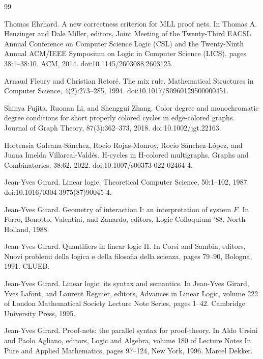 \documentclass[10pt,a4paper]{amsart}
\begin{document}
\begin{thebibliography}{99}
\par\noindent  [10]  Thomas Ehrhard.  A new correctness criterion for MLL proof nets.  In Thomas A. Henzinger and Dale Miller, editors, Joint Meeting of the Twenty-Third EACSL Annual Conference on Computer Science Logic (CSL) and the Twenty-Ninth Annual ACM/IEEE Symposium on Logic in Computer Science (LICS), pages 38:1–38:10. ACM, 2014.  doi:10.1145/2603088.2603125.  
 
\par\noindent  [11]  Arnaud Fleury and Christian Retoré.  The mix rule.  Mathematical Structures in Computer Science, 4(2):273–285, 1994.  doi:10.1017/S0960129500000451.  
 
\par\noindent  [12]  Shinya Fujita, Ruonan Li, and Shenggui Zhang.  Color degree and monochromatic degree conditions for short properly colored cycles in edge-colored graphs.  Journal of Graph Theory, 87(3):362–373, 2018.  doi:10.1002/jgt.22163.  
 
\par\noindent  [13]  Hortensia Galeana-Sánchez, Rocío Rojas-Monroy, Rocío Sánchez-López, and Juana Imelda Villareal-Valdés.  H-cycles in H-colored multigraphs.  Graphs and Combinatorics, 38:62, 2022.  doi:10.1007/s00373-022-02464-4.  
 
\par\noindent  [14]  Jean-Yves Girard.  Linear logic.  Theoretical Computer Science, 50:1–102, 1987.  doi:10.1016/0304-3975(87)90045-4.  
 
\par\noindent  [15]  Jean-Yves Girard.  Geometry of interaction I: an interpretation of system ${F}$.  In Ferro, Bonotto, Valentini, and Zanardo, editors, Logic Colloquium ’88. North-Holland, 1988.  
 
\par\noindent  [16]  Jean-Yves Girard.  Quantifiers in linear logic II.  In Corsi and Sambin, editors, Nuovi problemi della logica e della filosofia della scienza, pages 79–90, Bologna, 1991. CLUEB.  
 
\par\noindent  [17]  Jean-Yves Girard.  Linear logic: its syntax and semantics.  In Jean-Yves Girard, Yves Lafont, and Laurent Regnier, editors, Advances in Linear Logic, volume 222 of London Mathematical Society Lecture Note Series, pages 1–42. Cambridge University Press, 1995.  
 
\par\noindent  [18]  Jean-Yves Girard.  Proof-nets: the parallel syntax for proof-theory.  In Aldo Ursini and Paolo Agliano, editors, Logic and Algebra, volume 180 of Lecture Notes In Pure and Applied Mathematics, pages 97–124, New York, 1996. Marcel Dekker.  
 

\end{thebibliography}
\end{document}
